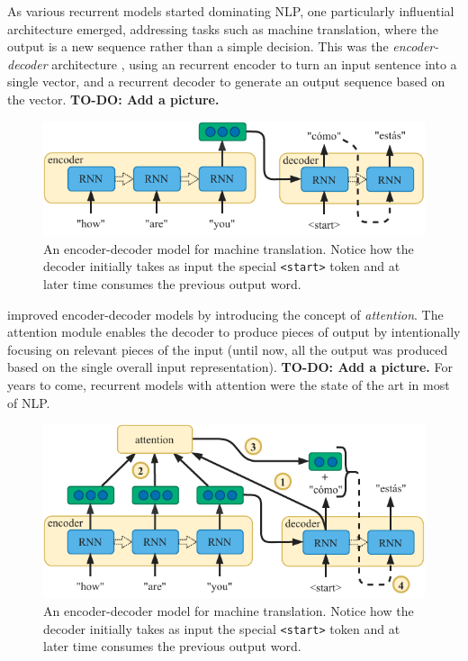 \documentclass[bsc,frontabs,twoside,singlespacing,parskip,deptreport]{infthesis}
\begin{document}
{{    %
    As various recurrent models started dominating NLP, one particularly influential architecture emerged, addressing tasks such as machine translation, where the output is a new sequence rather than a simple decision. This was the \textit{encoder-decoder} architecture \citep{Kalchbrenner_2013,Sutskever_2014}, using an recurrent encoder to turn an input sentence into a single vector, and a recurrent decoder to generate an output sequence based on the vector. \textbf{TO-DO: Add a picture.}
    \begin{figure}[h!t]
      \centering
      \includegraphics[width=11.5cm]{graphics/encoder-decoder}
      \cprotect\caption{An encoder-decoder model for machine translation. Notice how the decoder initially takes as input the special \verb|<start>| token and at later time consumes the previous output word.}
      \label{fig:encoder-decoder}
    \end{figure}

    \citet{Bahdanau_2014} improved encoder-decoder models by introducing the concept of \textit{attention}. The attention module enables the decoder to produce pieces of output by intentionally focusing on relevant pieces of the input (until now, all the output was produced based on the single overall input representation). \textbf{TO-DO: Add a picture.} For years to come, recurrent models with attention were the state of the art in most of NLP.
    \begin{figure}[h!t]
      \centering
      \includegraphics[width=11.5cm]{graphics/encoder-decoder-att}
      \cprotect\caption{An encoder-decoder model for machine translation. Notice how the decoder initially takes as input the special \verb|<start>| token and at later time consumes the previous output word.}
      \label{fig:encoder-decoder-att}
    \end{figure}
  }

}
\end{document}
